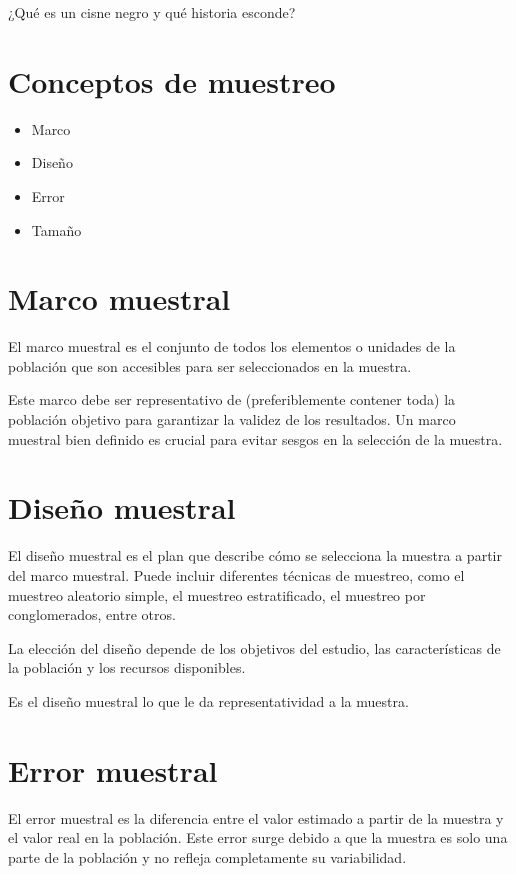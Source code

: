 \documentclass[
  letterpaper,
  DIV=11,
  numbers=noendperiod]{scrreprt}
\begin{document}
¿Qué es un cisne negro y qué historia esconde?

\section{Conceptos de muestreo}\label{conceptos-de-muestreo}

\begin{itemize}
\item
  Marco
\item
  Diseño
\item
  Error
\item
  Tamaño
\end{itemize}

\section{Marco muestral}\label{marco-muestral}

El marco muestral es el conjunto de todos los elementos o unidades de la
población que son accesibles para ser seleccionados en la muestra.

Este marco debe ser representativo de (preferiblemente contener toda) la
población objetivo para garantizar la validez de los resultados. Un
marco muestral bien definido es crucial para evitar sesgos en la
selección de la muestra.

\section{Diseño muestral}\label{diseuxf1o-muestral}

El diseño muestral es el plan que describe cómo se selecciona la muestra
a partir del marco muestral. Puede incluir diferentes técnicas de
muestreo, como el muestreo aleatorio simple, el muestreo estratificado,
el muestreo por conglomerados, entre otros.

La elección del diseño depende de los objetivos del estudio, las
características de la población y los recursos disponibles.

Es el diseño muestral lo que le da representatividad a la muestra.

\section{Error muestral}\label{error-muestral}

El error muestral es la diferencia entre el valor estimado a partir de
la muestra y el valor real en la población. Este error surge debido a
que la muestra es solo una parte de la población y no refleja
completamente su variabilidad.
\end{document}

